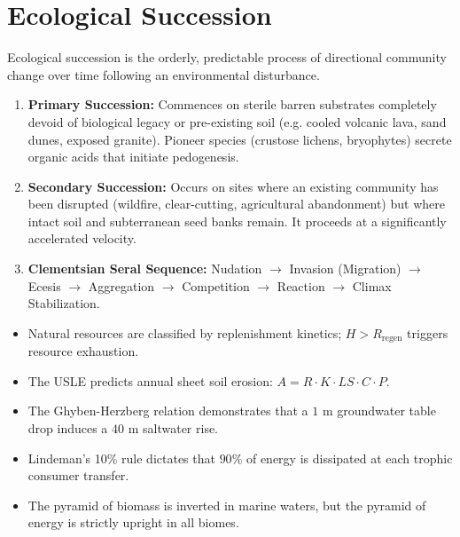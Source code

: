 \section{Ecological Succession}
Ecological succession is the orderly, predictable process of directional community change over time following an environmental disturbance.
\begin{enumerate}[leftmargin=1.5em]
    \item \textbf{Primary Succession:} Commences on sterile barren substrates completely devoid of biological legacy or pre-existing soil (e.g. cooled volcanic lava, sand dunes, exposed granite). Pioneer species (crustose lichens, bryophytes) secrete organic acids that initiate pedogenesis.
    \item \textbf{Secondary Succession:} Occurs on sites where an existing community has been disrupted (wildfire, clear-cutting, agricultural abandonment) but where intact soil and subterranean seed banks remain. It proceeds at a significantly accelerated velocity.
    \item \textbf{Clementsian Seral Sequence:} Nudation $\to$ Invasion (Migration) $\to$ Ecesis $\to$ Aggregation $\to$ Competition $\to$ Reaction $\to$ Climax Stabilization.
\end{enumerate}

\begin{quickrevision}
\begin{itemize}[leftmargin=1.2em]
    \item Natural resources are classified by replenishment kinetics; $H > R_{\text{regen}}$ triggers resource exhaustion.
    \item The USLE predicts annual sheet soil erosion: $A = R \cdot K \cdot LS \cdot C \cdot P$.
    \item The Ghyben-Herzberg relation demonstrates that a $1\text{ m}$ groundwater table drop induces a $40\text{ m}$ saltwater rise.
    \item Lindeman's 10\% rule dictates that $90\%$ of energy is dissipated at each trophic consumer transfer.
    \item The pyramid of biomass is inverted in marine waters, but the pyramid of energy is strictly upright in all biomes.
\end{itemize}
\end{quickrevision}
